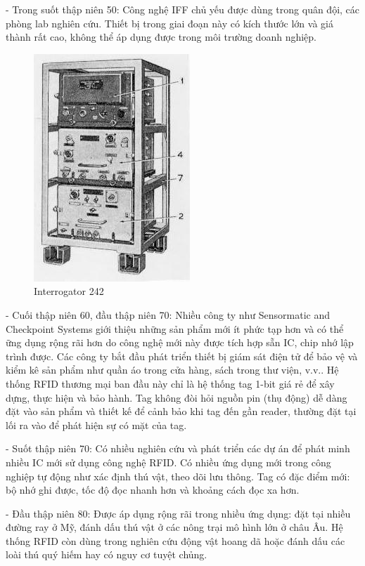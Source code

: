 - Trong suốt thập niên 50: Công nghệ IFF chủ yếu được dùng trong quân đội, các phòng lab nghiên cứu.
Thiết bị trong giai đoạn này có kích thước lớn và giá thành rất cao, không thể áp dụng được trong môi trường doanh nghiệp.
\begin{figure}[ht]
\centering
\includegraphics[scale=0.9]{images/interrogator_242.jpg}
\caption{Interrogator 242}
\end{figure}

- Cuối thập niên 60, đầu thập niên 70: Nhiều công ty như Sensormatic and Checkpoint Systems giới thiệu những sản phẩm mới ít phức tạp hơn và có thể ững dụng rộng rãi hơn do công nghệ mới này được tích hợp sẵn IC, chip nhớ lập trình được.
Các công ty bắt đầu phát triển thiết bị giám sát điện tử để bảo vệ và kiểm kê sản phẩm như quần áo trong cửa hàng, sách trong thư viện, v.v..
Hệ thống RFID thương mại ban đầu này chỉ là hệ thống tag 1-bit giá rẻ để xây dựng, thực hiện và bảo hành.
Tag không đòi hỏi nguồn pin (thụ động) dễ dàng đặt vào sản phẩm và thiết kế để cảnh bảo khi tag đến gần reader,
thường đặt tại lối ra vào để phát hiện sự có mặt của tag.

- Suốt thập niên 70: Có nhiều nghiên cứu và phát triển các dự án để phát minh nhiều IC mới sử dụng công nghệ RFID.
Có nhiều ứng dụng mới trong công nghiệp tự động như xác định thú vật, theo dõi lưu thông.
Tag có đặc điểm mới: bộ nhớ ghi được, tốc độ đọc nhanh hơn và khoảng cách đọc xa hơn.

- Đầu thập niên 80: Được áp dụng rộng rãi trong nhiều ứng dụng: đặt tại nhiều đường ray ở Mỹ,
đánh dấu thú vật ở các nông trại mô hình lớn ở châu Âu.
Hệ thống RFID còn dùng trong nghiên cứu động vật hoang dã hoặc đánh dấu các loài thú quý hiếm hay có nguy cơ tuyệt chủng.

